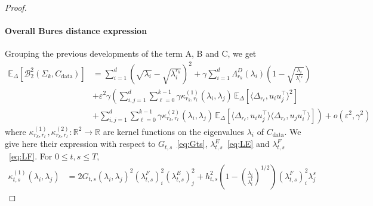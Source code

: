 \documentclass[11pt]{article}
\newcommand{\RR}{\mathbb{R}}
\newcommand{\EE}{\mathbb{E}}
\begin{document}
\begin{proof}
\paragraph{Overall Bures distance expression} Grouping the previous developments of the term A, B and C, we get
\begin{equation} \label{eq:expectation_W2_diff}
\begin{split}
\EE_{\Delta}[\mathcal{B}_2^2(\Sigma_{k}, C_\mathrm{data})] &=  \sum_{i=1}^d \left(\sqrt{\lambda_i} - \sqrt{\lambda^{r_k}_i} \right)^2 + \gamma \sum_{i=1}^d \Lambda^{D}_{r_k}(\lambda_i) \left( 1 - \sqrt{\frac{\lambda_i}{\lambda^{r_k}_i}} \right)\\
& + \varepsilon^2 \gamma \left( \sum_{i,j=1}^d   \sum_{\ell=0}^{k-1} \gamma\kappa^{(1)}_{r_k, r_l} (\lambda_i, \lambda_j) \, \EE_{\Delta}[\langle \Delta_{r_\ell}, u_iu_j^\top \rangle^2] \right. \\
&+ \left. \sum_{i,j=1}^d  \sum_{\ell=0}^{k-1} \gamma \kappa^{(2)}_{r_k, r_l}(\lambda_i,\lambda_j) \, \EE_{\Delta}[\langle \Delta_{r_\ell}, u_iu_j^\top \rangle \langle \Delta_{r_\ell}, u_ju_i^\top \rangle ] \right) + o(\varepsilon^2, \gamma^2) 
\end{split}
\end{equation}
where $\kappa^{(1)}_{r_k, r_l}, \kappa^{(2)}_{r_k, r_l} : \RR^2 \to \RR$ are kernel functions on the eigenvalues $\lambda_i$ of $C_\mathrm{data}$. We give here their expression with respect to $G_{t,s}$~\eqref{eq:Gts}, $\lambda^E_{t,s}$~\eqref{eq:LE} and $\lambda^F_{t,s}$~\eqref{eq:LF}. For $0 \leq t,s \leq T$, 
\begin{align} \label{eq:kappa1_diff}
\kappa^{(1)}_{t,s}(\lambda_i,\lambda_j) &=  2 G_{t,s}(\lambda_i,\lambda_j)^2 (\lambda^F_{t,s})^2_i (\lambda^E_{t,s})^2_j +  h_{t,s}^2 \left( 1 - \left( \frac{\lambda_i}{\lambda^t_i }\right)^{1/2}\right) (\lambda^F_{t,s})^2_i \lambda^s_j %

\end{align}
\end{proof}
\end{document}

